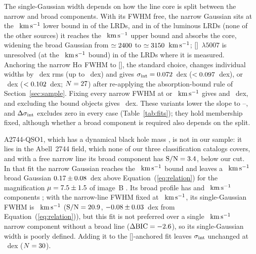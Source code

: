 \documentclass[twocolumn,linenumbers]{aastex701}
\newcommand{\Ha}{H$\alpha$}
\newcommand{\kms}{\ensuremath{{\rm km\,s^{-1}}}}
\newcommand{\sigint}{\sigma_{\rm int}}
\begin{document}
The single-Gaussian width depends on how the line core is split between the narrow and broad components.
With its FWHM free, the narrow Gaussian sits at the \wnarLo{}~\kms{} lower bound in \NNarThirty{} of the \NLRD{} LRDs, and in \NNarBoundLRD{} of the \NBright{} luminous LRDs (none of the \NOther{} other sources) it reaches the \wnarHi{}~\kms{} upper bound and absorbs the core, widening the broad Gaussian from $\simeq2400{}$ to $\simeq3150{}$~\kms{}; []~$\lambda5007$ is unresolved (at the \wnarLo{}~\kms{} bound) in \NOIIIUnres{} of the \NOIIIMeas{} LRDs where it is measured.
Anchoring the narrow \Ha{} FWHM to [], the standard choice, changes individual widths by \dWNarRms{}~dex rms (up to \dWNarMax{}~dex) and gives $\sigint=\FsigNarOIII{}$~dex ($<0.097{}$~dex), or \FsigOIIIqc{}~dex ($<0.102{}$~dex; $N=27{}$) after re-applying the absorption-bound rule of Section~\ref{sec:sample}.
Fixing every narrow FWHM at \wnarLo{} or \wnarDef{}~\kms{} gives \FsigNarMin{} and \FsigNarFix{}~dex, and excluding the \NNarBoundLRD{} bound objects gives \FsigNarCut{}~dex.
These variants lower the slope to \FbNarFix{}--\FbNarOIII{}, and $\Delta\sigint$ excludes zero in every case (Table~\ref{tab:fits}); they hold membership fixed, although whether a broad component is required also depends on the split.

A2744-QSO1, which has a dynamical black hole mass \citep{Juodzbalis2026}, is not in our sample: it lies in the Abell~2744 field, which none of our three classification catalogs covers, and with a free narrow line its broad component has ${\rm S/N}=3.4{}$, below our cut.
In that fit the narrow Gaussian reaches the \wnarHi{}~\kms{} bound and leaves a \QSOW{}~\kms{} broad Gaussian $0.17{}\pm0.08{}$~dex above Equation~(\ref{eq:relation}) for the magnification $\mu=7.5{}\pm1.5{}$ of image~B \citep{Furtak2025}.
Its broad profile has \QSOcompNar{} and \QSOcompBrd{}~\kms{} components \citep{DEugenio2026,Juodzbalis2026}; with the narrow-line FWHM fixed at \wnarDef{}~\kms{}, its single-Gaussian FWHM is \QSOWfix{}~\kms{} (${\rm S/N}=20.9{}$, $-0.08{}\pm0.03{}$~dex from Equation~(\ref{eq:relation})), but this fit is not preferred over a single \wnarHi{}~\kms{} narrow component without a broad line ($\Delta{\rm BIC}=-2.6{}$), so its single-Gaussian width is poorly defined.
Adding it to the []-anchored fit leaves $\sigint$ unchanged at \FsigNarOIIIqso{}~dex ($N=30{}$).
\end{document}
